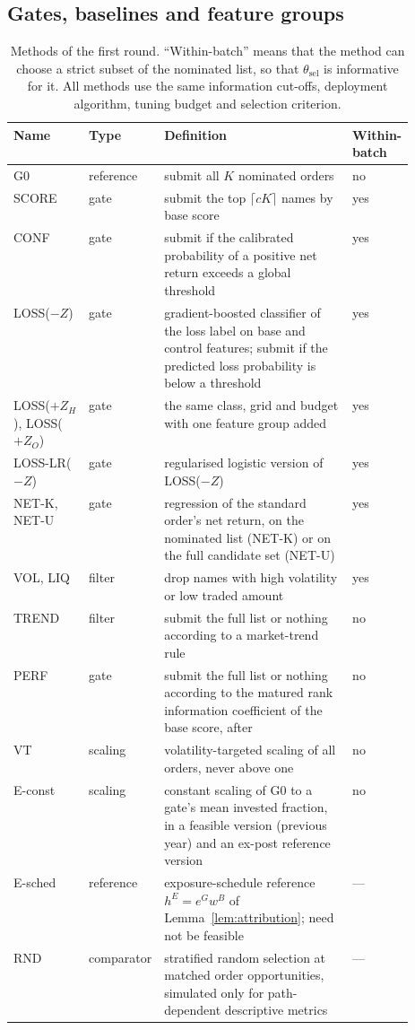\documentclass[11pt]{article}
\theoremstyle{remark}
\newcommand{\thetasel}{\theta_{\mathrm{sel}}}
\newcommand{\ZH}{Z_H}
\newcommand{\ZO}{Z_O}
\begin{document}
\subsection{Gates, baselines and feature groups}

\begin{table}[t]
\centering
\caption{Methods of the first round. ``Within-batch'' means that the method can choose a strict
subset of the nominated list, so that $\thetasel$ is informative for it. All methods use the
same information cut-offs, deployment algorithm, tuning budget and selection criterion.}
\label{tab:methods}
\small
\begin{tabular}{@{}llp{0.52\linewidth}l@{}}
\toprule
Name & Type & Definition & Within-batch \\
\midrule
G0 & reference & submit all $K$ nominated orders & no \\
SCORE & gate & submit the top $\lceil cK\rceil$ names by base score & yes \\
CONF & gate & submit if the calibrated probability of a positive net return exceeds a global
threshold & yes \\
LOSS($-Z$) & gate & gradient-boosted classifier of the loss label on base and control features;
submit if the predicted loss probability is below a threshold & yes \\
LOSS($+\ZH$), LOSS($+\ZO$) & gate & the same class, grid and budget with one feature group
added & yes \\
LOSS-LR($-Z$) & gate & regularised logistic version of LOSS($-Z$) & yes \\
NET-K, NET-U & gate & regression of the standard order's net return, on the nominated list
(NET-K) or on the full candidate set (NET-U) & yes \\
VOL, LIQ & filter & drop names with high volatility or low traded amount & yes \\
TREND & filter & submit the full list or nothing according to a market-trend rule & no \\
PERF & gate & submit the full list or nothing according to the matured rank information
coefficient of the base score, after \citet{sanderink2026alpha} & no \\
VT & scaling & volatility-targeted scaling of all orders, never above one & no \\
E-const & scaling & constant scaling of G0 to a gate's mean invested fraction, in a feasible
version (previous year) and an ex-post reference version & no \\
E-sched & reference & exposure-schedule reference $h^E=e^Gw^B$ of
Lemma~\ref{lem:attribution}; need not be feasible & --- \\
RND & comparator & stratified random selection at matched order opportunities, simulated only
for path-dependent descriptive metrics & --- \\
\bottomrule
\end{tabular}
\end{table}
\end{document}
